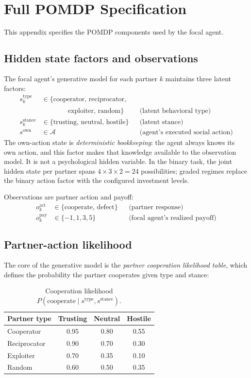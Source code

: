 \section{Full POMDP Specification}
\label{app:pomdp}

This appendix specifies the POMDP components used by the focal agent.

\subsection{Hidden state factors and observations}

The focal agent's generative model for each partner $k$ maintains three latent factors:
\begin{align}
s_k^{\text{type}} &\in \{\text{cooperator, reciprocator,} \nonumber\\
  &\phantom{s_k^{\text{type}} \in \{}\;\text{exploiter, random}\} && \text{(latent behavioral type)} \label{eq:s_type}\\
s_k^{\text{stance}} &\in \{\text{trusting, neutral, hostile}\} && \text{(latent stance)} \label{eq:s_stance}\\
s^{\text{own}} &\in \mathcal{A} && \text{(agent's executed social action)}
\end{align}
The own-action state is \emph{deterministic bookkeeping}: the agent always knows its own action, and this factor makes that knowledge available to the observation model. It is not a psychological hidden variable. In the binary task, the joint hidden state per partner spans $4 \times 3 \times 2 = 24$ possibilities; graded regimes replace the binary action factor with the configured investment levels.

Observations are partner action and payoff:
\begin{align}
o_k^{\text{act}} &\in \{\text{cooperate, defect}\} & &\text{(partner response)}\\
o_k^{\text{pay}} &\in \{-1, 1, 3, 5\} & &\text{(focal agent's realized payoff)}
\end{align}

\subsection{Partner-action likelihood}

The core of the generative model is the \emph{partner cooperation likelihood table}, which defines the probability the partner cooperates given type and stance:
\begin{table}[H]
\centering
\caption{Cooperation likelihood $P(\text{cooperate} \mid s^{\text{type}}, s^{\text{stance}})$.}
\label{tab:coop_table}
\begin{tabular}{lccc}
\toprule
Partner type & Trusting & Neutral & Hostile \\
\midrule
Cooperator & 0.95 & 0.80 & 0.55 \\
Reciprocator & 0.90 & 0.70 & 0.30 \\
Exploiter & 0.70 & 0.35 & 0.10 \\
Random & 0.60 & 0.50 & 0.35 \\
\bottomrule
\end{tabular}
\end{table}

